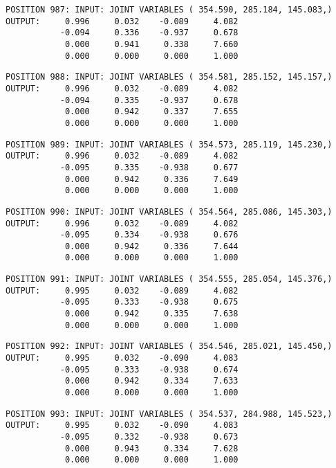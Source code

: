\begin{verbatim}
POSITION 987: INPUT: JOINT VARIABLES ( 354.590, 285.184, 145.083,)
OUTPUT:     0.996     0.032    -0.089     4.082
           -0.094     0.336    -0.937     0.678
            0.000     0.941     0.338     7.660
            0.000     0.000     0.000     1.000
\end{verbatim} \pagebreak[1]\begin{verbatim}
POSITION 988: INPUT: JOINT VARIABLES ( 354.581, 285.152, 145.157,)
OUTPUT:     0.996     0.032    -0.089     4.082
           -0.094     0.335    -0.937     0.678
            0.000     0.942     0.337     7.655
            0.000     0.000     0.000     1.000
\end{verbatim} \pagebreak[1]\begin{verbatim}
POSITION 989: INPUT: JOINT VARIABLES ( 354.573, 285.119, 145.230,)
OUTPUT:     0.996     0.032    -0.089     4.082
           -0.095     0.335    -0.938     0.677
            0.000     0.942     0.336     7.649
            0.000     0.000     0.000     1.000
\end{verbatim} \pagebreak[1]\begin{verbatim}
POSITION 990: INPUT: JOINT VARIABLES ( 354.564, 285.086, 145.303,)
OUTPUT:     0.996     0.032    -0.089     4.082
           -0.095     0.334    -0.938     0.676
            0.000     0.942     0.336     7.644
            0.000     0.000     0.000     1.000
\end{verbatim} \pagebreak[1]\begin{verbatim}
POSITION 991: INPUT: JOINT VARIABLES ( 354.555, 285.054, 145.376,)
OUTPUT:     0.995     0.032    -0.089     4.082
           -0.095     0.333    -0.938     0.675
            0.000     0.942     0.335     7.638
            0.000     0.000     0.000     1.000
\end{verbatim} \pagebreak[1]\begin{verbatim}
POSITION 992: INPUT: JOINT VARIABLES ( 354.546, 285.021, 145.450,)
OUTPUT:     0.995     0.032    -0.090     4.083
           -0.095     0.333    -0.938     0.674
            0.000     0.942     0.334     7.633
            0.000     0.000     0.000     1.000
\end{verbatim} \pagebreak[1]\begin{verbatim}
POSITION 993: INPUT: JOINT VARIABLES ( 354.537, 284.988, 145.523,)
OUTPUT:     0.995     0.032    -0.090     4.083
           -0.095     0.332    -0.938     0.673
            0.000     0.943     0.334     7.628
            0.000     0.000     0.000     1.000
\end{verbatim} \pagebreak[1]\begin{verbatim}

\end{verbatim}
